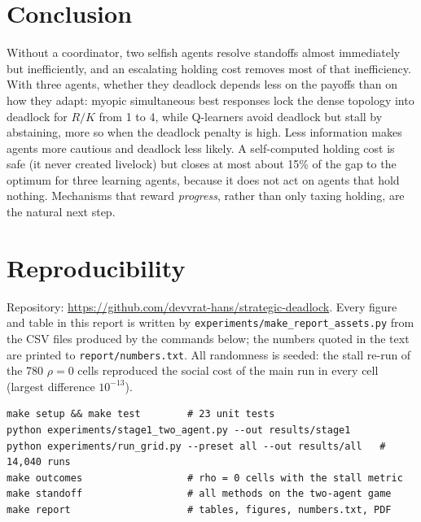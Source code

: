 \documentclass[10pt]{article}
\newcommand{\repourl}{\url{https://github.com/devvrat-hans/strategic-deadlock}}
\begin{document}
\section{Conclusion}
Without a coordinator, two selfish agents resolve standoffs almost immediately but inefficiently, and an escalating
holding cost removes most of that inefficiency. With three agents, whether they deadlock depends less on the payoffs than
on how they adapt: myopic simultaneous best responses lock the dense topology into deadlock for $R/K$ from 1 to 4, while
Q-learners avoid deadlock but stall by abstaining, more so when the deadlock penalty is high. Less information makes agents more cautious and deadlock less likely. A
self-computed holding cost is safe (it never created livelock) but closes at most about 15\% of the gap to the optimum for
three learning agents, because it does not act on agents that hold nothing. Mechanisms that reward \emph{progress}, rather
than only taxing holding, are the natural next step.

\appendix
\section{Reproducibility}\label{sec:repro}
Repository: \repourl. Every figure and table in this report is written by \texttt{experiments/make\_report\_assets.py}
from the CSV files produced by the commands below; the numbers quoted in the text are printed to
\texttt{report/numbers.txt}. All randomness is seeded: the stall re-run of the 780 $\rho=0$ cells reproduced the social cost of the main run
in every cell (largest difference $10^{-13}$).
\begin{verbatim}
make setup && make test        # 23 unit tests
python experiments/stage1_two_agent.py --out results/stage1
python experiments/run_grid.py --preset all --out results/all   # 14,040 runs
make outcomes                  # rho = 0 cells with the stall metric
make standoff                  # all methods on the two-agent game
make report                    # tables, figures, numbers.txt, PDF
\end{verbatim}
\end{document}
